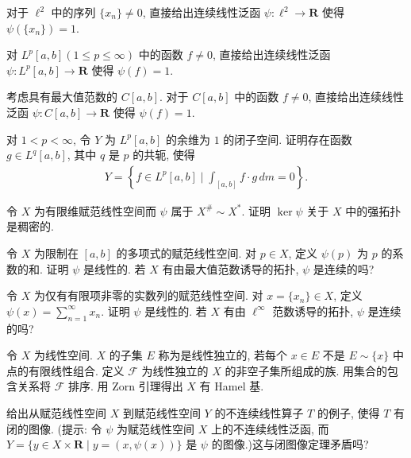 \documentclass[../../main.tex]{subfiles}
\begin{document}
\begin{exercise}\label{exercise:ch14-10}
对于 $\ell^{2}$ 中的序列 $\{x_{n}\}\neq 0$, 直接给出连续线性泛函 $\psi:\ell^{2}\to\mathbf{R}$ 使得 $\psi(\{x_{n}\})=1$.
\end{exercise}

\begin{exercise}\label{exercise:ch14-11}
对 $L^{p}[a,b](1\leqslant p\leqslant\infty)$ 中的函数 $f\neq 0$, 直接给出连续线性泛函 $\psi:L^{p}[a,b]\to\mathbf{R}$ 使得 $\psi(f)=1$.
\end{exercise}

\begin{exercise}\label{exercise:ch14-12}
考虑具有最大值范数的 $C[a,b]$. 对于 $C[a,b]$ 中的函数 $f\neq 0$, 直接给出连续线性泛函 $\psi:C[a,b]\to\mathbf{R}$ 使得 $\psi(f)=1$.
\end{exercise}

\begin{exercise}\label{exercise:ch14-13}
对 $1<p<\infty$, 令 $Y$ 为 $L^{p}[a,b]$ 的余维为 $1$ 的闭子空间. 证明存在函数 $g\in L^{q}[a,b]$, 其中 $q$ 是 $p$ 的共轭, 使得
\begin{align*}
Y=\left\{f\in L^{p}[a,b]\mid\int_{[a,b]}f\cdot g\,dm=0\right\}.
\end{align*}
\end{exercise}

\begin{exercise}\label{exercise:ch14-14}
令 $X$ 为有限维赋范线性空间而 $\psi$ 属于 $X^{\#}\sim X^{*}$. 证明 $\ker\psi$ 关于 $X$ 中的强拓扑是稠密的.
\end{exercise}

\begin{exercise}\label{exercise:ch14-15}
令 $X$ 为限制在 $[a,b]$ 的多项式的赋范线性空间. 对 $p\in X$, 定义 $\psi(p)$ 为 $p$ 的系数的和. 证明 $\psi$ 是线性的. 若 $X$ 有由最大值范数诱导的拓扑, $\psi$ 是连续的吗?
\end{exercise}

\begin{exercise}\label{exercise:ch14-16}
令 $X$ 为仅有有限项非零的实数列的赋范线性空间. 对 $x=\{x_{n}\}\in X$, 定义 $\psi(x)=\sum_{n=1}^{\infty}x_{n}$. 证明 $\psi$ 是线性的. 若 $X$ 有由 $\ell^{\infty}$ 范数诱导的拓扑, $\psi$ 是连续的吗?
\end{exercise}

\begin{exercise}\label{exercise:ch14-17}
令 $X$ 为线性空间. $X$ 的子集 $E$ 称为是线性独立的, 若每个 $x\in E$ 不是 $E\sim\{x\}$ 中点的有限线性组合. 定义 $\mathcal{F}$ 为线性独立的 $X$ 的非空子集所组成的族. 用集合的包含关系将 $\mathcal{F}$ 排序. 用 Zorn 引理得出 $X$ 有 Hamel 基.
\end{exercise}

\begin{exercise}\label{exercise:ch14-18}
给出从赋范线性空间 $X$ 到赋范线性空间 $Y$ 的不连续线性算子 $T$ 的例子, 使得 $T$ 有闭的图像. (提示: 令 $\psi$ 为赋范线性空间 $X$ 上的不连续线性泛函, 而 $Y=\{y\in X\times\mathbf{R}\mid y=(x,\psi(x))\}$ 是 $\psi$ 的图像.)这与闭图像定理矛盾吗?
\end{exercise}
\end{document}
